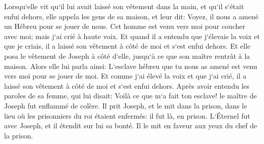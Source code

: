\verse Lorsqu`elle vit qu`il lui avait laissé son vêtement dans la main, et qu`il s`était enfui dehors, 
\verse elle appela les gens de sa maison, et leur dit: Voyez, il nous a amené un Hébreu pour se jouer de nous. Cet homme est venu vers moi pour coucher avec moi; mais j`ai crié à haute voix. 
\verse Et quand il a entendu que j`élevais la voix et que je criais, il a laissé son vêtement à côté de moi et s`est enfui dehors. 
\verse Et elle posa le vêtement de Joseph à côté d`elle, jusqu`à ce que son maître rentrât à la maison. 
\verse Alors elle lui parla ainsi: L`esclave hébreu que tu nous as amené est venu vers moi pour se jouer de moi. 
\verse Et comme j`ai élevé la voix et que j`ai crié, il a laissé son vêtement à côté de moi et s`est enfui dehors. 
\verse Après avoir entendu les paroles de sa femme, qui lui disait: Voilà ce que m`a fait ton esclave! le maître de Joseph fut enflammé de colère. 
\verse Il prit Joseph, et le mit dans la prison, dans le lieu où les prisonniers du roi étaient enfermés: il fut là, en prison. 
\verse L`Éternel fut avec Joseph, et il étendit sur lui sa bonté. Il le mit en faveur aux yeux du chef de la prison. 
